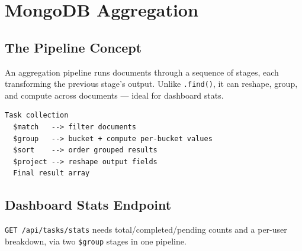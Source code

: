 \chapter{MongoDB Aggregation}

\section{The Pipeline Concept}

An aggregation pipeline runs documents through a sequence of stages, each
transforming the previous stage's output. Unlike \texttt{.find()}, it can
reshape, group, and compute across documents --- ideal for dashboard stats.

\begin{diagrambox}
\begin{verbatim}
Task collection
  $match   --> filter documents
  $group   --> bucket + compute per-bucket values
  $sort    --> order grouped results
  $project --> reshape output fields
  Final result array
\end{verbatim}
\end{diagrambox}

\section{Dashboard Stats Endpoint}

\texttt{GET /api/tasks/stats} needs total/completed/pending counts and a
per-user breakdown, via two \texttt{\$group} stages in one pipeline.

